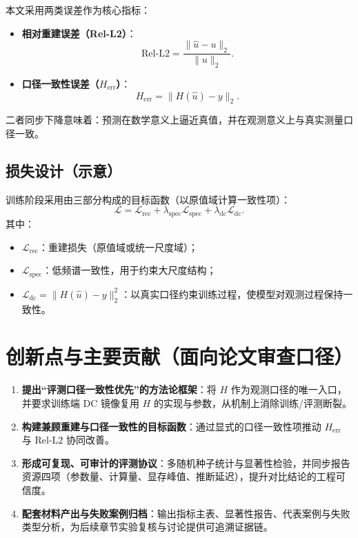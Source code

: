本文采用两类误差作为核心指标：
\begin{itemize}
  \item \textbf{相对重建误差（Rel-L2）}：
  \begin{equation}
    \mathrm{Rel\text{-}L2}=\frac{\lVert \hat{u}-u\rVert_2}{\lVert u\rVert_2}.
    \label{eq:rel-l2}
  \end{equation}
  \item \textbf{口径一致性误差（\(H_{\mathrm{err}}\)）}：
  \begin{equation}
    H_{\mathrm{err}}=\lVert H(\hat{u})-y\rVert_2.
    \label{eq:h-err}
  \end{equation}
\end{itemize}
二者同步下降意味着：预测在数学意义上逼近真值，并在观测意义上与真实测量口径一致。

\subsection{损失设计（示意）}

训练阶段采用由三部分构成的目标函数（以原值域计算一致性项）：
\begin{equation}
  \mathcal{L}=\mathcal{L}_{\mathrm{rec}}
  +\lambda_{\mathrm{spec}}\mathcal{L}_{\mathrm{spec}}
  +\lambda_{\mathrm{dc}}\mathcal{L}_{\mathrm{dc}}.
  \label{eq:loss}
\end{equation}
其中：
\begin{itemize}
  \item \(\mathcal{L}_{\mathrm{rec}}\)：重建损失（原值域或统一尺度域）；
  \item \(\mathcal{L}_{\mathrm{spec}}\)：低频谱一致性，用于约束大尺度结构；
  \item \(\mathcal{L}_{\mathrm{dc}}=\lVert H(\hat{u})-y\rVert_2^2\)：以真实口径约束训练过程，使模型对观测过程保持一致性。
\end{itemize}

\section{创新点与主要贡献（面向论文审查口径）}

\begin{enumerate}
  \item \textbf{提出“评测口径一致性优先”的方法论框架}：将 \(H\) 作为观测口径的唯一入口，并要求训练端 \(\mathrm{DC}\) 镜像复用 \(H\) 的实现与参数，从机制上消除训练/评测断裂。
  \item \textbf{构建兼顾重建与口径一致性的目标函数}：通过显式的口径一致性项推动 \(H_{\mathrm{err}}\) 与 \(\mathrm{Rel\text{-}L2}\) 协同改善。
  \item \textbf{形成可复现、可审计的评测协议}：多随机种子统计与显著性检验，并同步报告资源四项（参数量、计算量、显存峰值、推断延迟），提升对比结论的工程可信度。
  \item \textbf{配套材料产出与失败案例归档}：输出指标主表、显著性报告、代表案例与失败类型分析，为后续章节实验复核与讨论提供可追溯证据链。
\end{enumerate}

